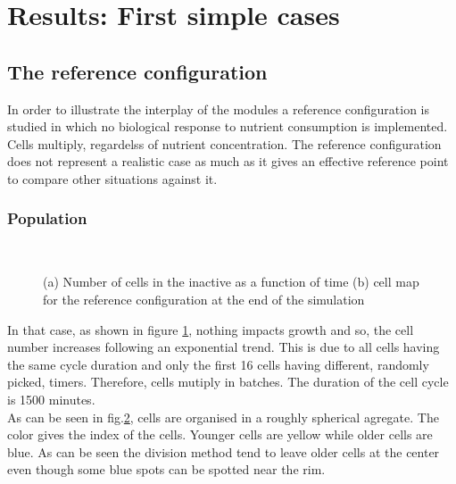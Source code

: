 \documentclass[11pt,a4paper]{article}
\begin{document}
\newpage
\section{Results: First simple cases}
\subsection{The reference configuration}
In order to illustrate the interplay of the modules a reference configuration is studied in which no biological response to nutrient consumption is implemented. Cells multiply, regardelss of nutrient concentration. The reference configuration does not represent a realistic case as much as it gives an effective reference point to compare other situations against it.\\

\subsubsection{Population}
\begin{figure}[ht!]
\begin{subfigure}{0.5\textwidth}
	\centering
	
	\caption{ \label{ref_numbers}}
\end{subfigure}
~~
\begin{subfigure}{0.5\textwidth}
	\centering
	
	\caption{\label{ref_Grid}}
\end{subfigure}
\caption{(a) Number of cells in the inactive as a function of time (b) cell map for the reference configuration at the end of the simulation \label{ref_population}}
\end{figure}

In that case, as shown in figure \ref{ref_numbers}, nothing impacts growth and so, the cell number increases following an exponential trend. This is due to all cells having the same cycle duration and only the first 16 cells having different, randomly picked, timers. Therefore, cells mutiply in batches. The duration of the cell cycle is 1500 minutes.\\

As can be seen in fig.\ref{ref_Grid}, cells are organised in a roughly spherical agregate. The color gives the index of the cells. Younger cells are yellow while older cells are blue. As can be seen the division method tend to leave older cells at the center even though some blue spots can be spotted near the rim. \\ 
\end{document}
